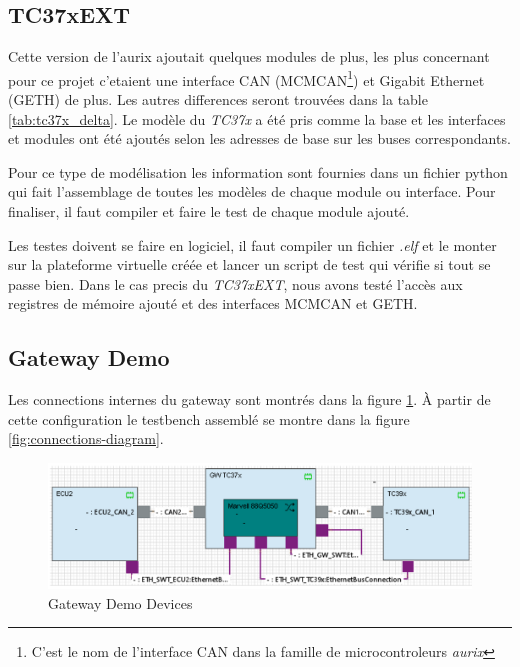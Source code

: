 \subsection{TC37xEXT}

Cette version de l'aurix ajoutait quelques modules de plus, les plus concernant pour ce projet c'etaient une interface CAN (MCMCAN\footnote{C'est le nom de l'interface CAN dans la famille de microcontroleurs \textit{aurix}}) et Gigabit Ethernet (GETH) de plus. Les autres differences seront trouv\'ees dans la table \ref{tab:tc37x_delta}. Le modèle du \textit{TC37x}\cite{aurix.tc37x} a \'et\'e pris comme la base et les interfaces et modules ont \'et\'e ajout\'es selon les adresses de base sur les buses correspondants.



Pour ce type de modélisation les information sont fournies dans un fichier python qui fait l'assemblage de toutes les modèles de chaque module ou interface. Pour finaliser, il faut compiler et faire le test de chaque module ajout\'e.

Les testes doivent se faire en logiciel, il faut compiler un fichier \textit{.elf} et le monter sur la plateforme virtuelle cr\'e\'ee et lancer un script de test qui vérifie si tout se passe bien. Dans le cas precis du \textit{TC37xEXT},  nous avons test\'e l'accès aux registres de mémoire ajout\'e et des interfaces MCMCAN et GETH.

\subsection{Gateway Demo}

Les connections internes du gateway sont montr\'es dans la figure \ref{fig:devices-diagram}. \`A partir de cette configuration le testbench assembl\'e se montre dans la figure \ref{fig:connections-diagram}. %

\begin{figure}[!htb]
 \centering
 \includegraphics[width=\textwidth]{img/GWDemoConnections.PNG}
 \caption{Gateway Demo Devices}
 \label{fig:devices-diagram}
\end{figure}

